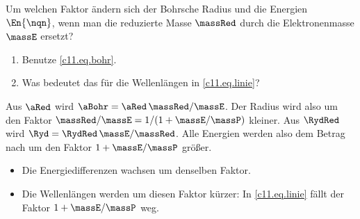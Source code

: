 \begin{exercise}\label{c11.exc.unendlich}
  Um welchen Faktor ändern sich der Bohrsche Radius und die Energien $\En{\nqn}$, wenn
  man die reduzierte Masse $\massRed$ durch die Elektronenmasse $\massE$ ersetzt?
  \begin{enumerate}
    \item Benutze \eqref{c11.eq.bohr}.
    \item Was bedeutet das für die Wellenlängen in \eqref{c11.eq.linie}?
  \end{enumerate}
\end{exercise}
\begin{solution}
  Aus $\aRed$ wird $\aBohr = \aRed\,\massRed/\massE$. Der Radius wird also um den
  Faktor $\massRed/\massE = 1/(1 + \massE/\massP)$ kleiner. Aus $\RydRed$ wird
  $\Ryd = \RydRed\,\massE/\massRed$. Alle Energien werden also dem Betrag nach um den
  Faktor $1 + \massE/\massP$ größer.
  \begin{itemize}
    \item Die Energiedifferenzen wachsen um denselben Faktor.
    \item Die Wellenlängen werden um diesen Faktor kürzer: In \eqref{c11.eq.linie}
      fällt der Faktor $1 + \massE/\massP$ weg.
  \end{itemize}
\end{solution}



